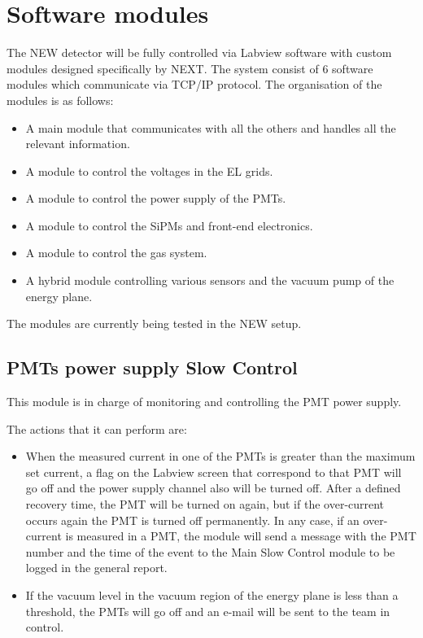 \section{Software modules}

The NEW detector will be fully controlled via Labview software with custom modules designed specifically by NEXT. The system consist of 6 software modules which communicate via TCP/IP protocol. The organisation of the modules is as follows:

\begin{itemize}
\item A main module that communicates with all the others and handles all the relevant information.
\item A module to control the voltages in the EL grids.
\item A module to control the power supply of the PMTs.
\item A module to control the SiPMs and front-end electronics.
\item A module to control the gas system.
\item A hybrid module controlling various sensors and the vacuum pump of the energy plane.
\end{itemize}


The modules are currently being tested in the NEW setup.

\subsection{PMTs power supply Slow Control}

This module is in charge of monitoring and controlling the PMT power supply. 

%
The actions that it can perform are:
\begin{itemize}
\item When the measured current in one of the PMTs is greater than the maximum set current, a flag on the Labview screen that correspond to that PMT will go off and the power supply channel also will be turned off. After a defined recovery time, the PMT will be turned on again, but if the over-current occurs again the PMT is turned off permanently. 
In any case, if an over-current is measured in a PMT, the module will send a message with the PMT number and the time of the event to the Main Slow Control module to be logged in the general report.
\item If the vacuum level in the vacuum region of the energy plane is less than a threshold, the PMTs will go off and an e-mail will be sent to the team in control. 
\end{itemize}

